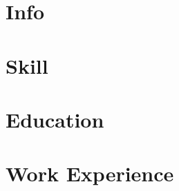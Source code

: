 \documentclass{article}
\begin{document}
	\section*{Info}
		
	\section*{Skill}
		
	\section*{Education}
		
	\section*{Work Experience}
		
\end{document}
